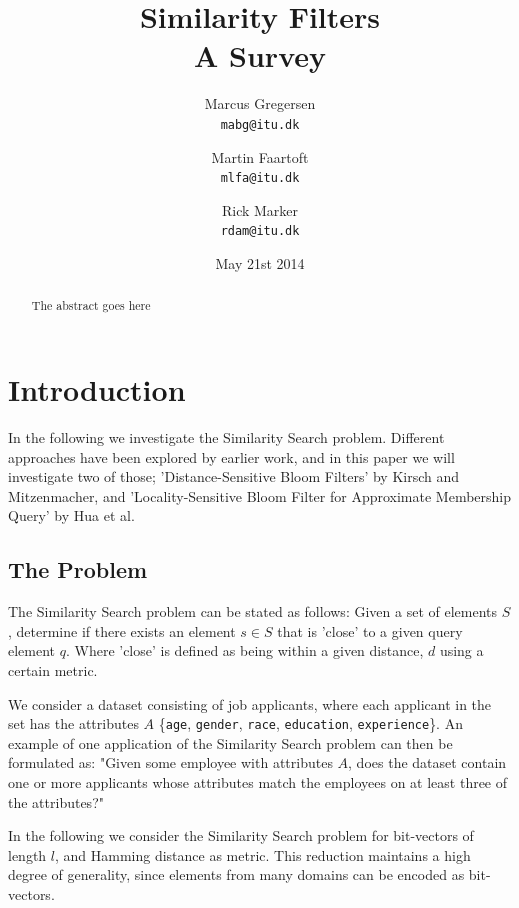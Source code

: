 \documentclass[a4paper,11pt]{article}
\begin{document}
\graphicspath{ {./images/} }
\date{May 21st 2014}
\title{Similarity Filters\\A Survey}

\author{Marcus Gregersen\\
\texttt{mabg@itu.dk}
\and Martin Faartoft\\
\texttt{mlfa@itu.dk}
\and Rick Marker\\
\texttt{rdam@itu.dk}}
\clearpage\maketitle
\thispagestyle{empty}
\setcounter{page}{1}
\begin{abstract}
The abstract goes here
\end{abstract}

\newpage
\setcounter{page}{1}

\section{Introduction}
In the following we investigate the Similarity Search problem. Different approaches have been explored by earlier work, and in this paper we will investigate two of those; 'Distance-Sensitive Bloom Filters'\cite{paper:harvard} by Kirsch and Mitzenmacher, and 'Locality-Sensitive Bloom Filter for Approximate Membership Query'\cite{paper:hua} by Hua et al.

\subsection{The Problem}
The Similarity Search problem can be stated as follows: Given a set of elements $S$, determine if there exists an element $s \in S$ that is 'close' to a given query element $q$. Where 'close' is defined as being within a given distance, $d$ using a certain metric.

We consider a dataset consisting of job applicants, where each applicant in the set has the attributes $A$ \{\texttt{age}, \texttt{gender}, \texttt{race}, \texttt{education}, \texttt{experience}\}.
An example of one application of the Similarity Search problem can then be formulated as: "Given some employee with attributes $A$, does the dataset contain one or more applicants whose attributes match the employees on at least three of the attributes?"

In the following we consider the Similarity Search problem for bit-vectors of length $l$, and Hamming distance as metric. This reduction maintains a high degree of generality, since elements from many domains can be encoded as bit-vectors.
\end{document}

